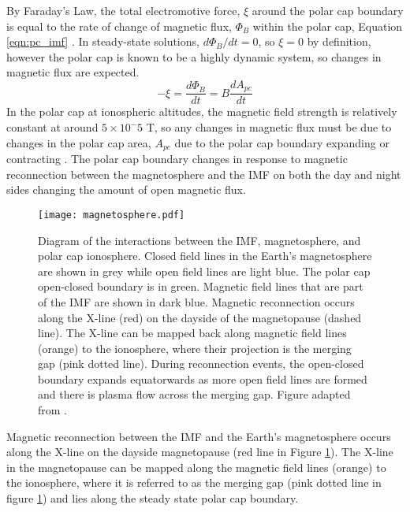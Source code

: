By Faraday's Law, the total electromotive force, \(\xi\) around the polar cap boundary is equal to the rate of change of magnetic flux, \(\Phi_B\) within the polar cap, Equation \ref{eqn:pc_imf} \citep{Lockwood1992a}.  In steady-state solutions, \(d\Phi_B/dt = 0\), so \(\xi=0\) by definition, however the polar cap is known to be a highly dynamic system, so changes in magnetic flux are expected.
\begin{equation}
	\label{eqn:pc_imf}
	-\xi = \frac{d\Phi_B}{dt} = B\frac{dA_{pc}}{dt}
\end{equation}
In the polar cap at ionospheric altitudes, the magnetic field strength is relatively constant at around \(5\times 10^-5\) T, so any changes in magnetic flux must be due to changes in the polar cap area, \(A_{pc}\) due to the polar cap boundary expanding or contracting \citep{Lockwood1992a}.  The polar cap boundary changes in response to magnetic reconnection between the magnetosphere and the IMF  on both the day and night sides changing the amount of open magnetic flux.


\begin{figure}
	\texttt{[image: magnetosphere.pdf]}
	\caption[Magnetic reconnection footprint in the ionosphere]{Diagram of the interactions between the IMF, magnetosphere, and polar cap ionosphere.  Closed field lines in the Earth's magnetosphere are shown in grey while open field lines are light blue.  The polar cap open-closed boundary is in green.  Magnetic field lines that are part of the IMF are shown in dark blue.  Magnetic reconnection occurs along the X-line (red) on the dayside of the magnetopause (dashed line).  The X-line can be mapped back along magnetic field lines (orange) to the ionosphere, where their projection is the merging gap (pink dotted line).  During reconnection events, the open-closed boundary expands equatorwards as more open field lines are formed and there is plasma flow across the merging gap. Figure adapted from \citet{Cowley1991}.}
	\label{fig:magnetosphere}
\end{figure}

Magnetic reconnection between the IMF and the Earth's magnetosphere occurs along the X-line on the dayside magnetopause (red line in Figure \ref{fig:magnetosphere}).  The X-line in the magnetopause can be mapped along the magnetic field lines (orange) to the ionosphere, where it is referred to as the merging gap (pink dotted line in figure \ref{fig:magnetosphere}) and lies along the steady state polar cap boundary.  

